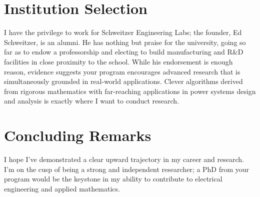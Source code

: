 \documentclass[letterpaper]{article}
\begin{document}
\section*{Institution Selection}
I have the privilege to work for Schweitzer Engineering Labs; the founder, Ed Schweitzer,
is an alumni. He has nothing but praise for the university, going so far as to endow a professorship
and electing to build manufacturing and R\&D facilities in close proximity to the school.
While his endorsement is enough reason, evidence suggests your program encourages advanced research
that is simultaneously grounded in real-world applications. Clever algorithms derived from rigorous
mathematics with far-reaching applications in power systems design and analysis is exactly where I
want to conduct research.

\section*{Concluding Remarks}
I hope I've demonstrated a clear upward trajectory in my career and research.
I'm on the cusp of being a strong and independent researcher; a PhD from your program
would be the keystone in my ability to contribute to electrical engineering and applied
mathematics.
\end{document}
